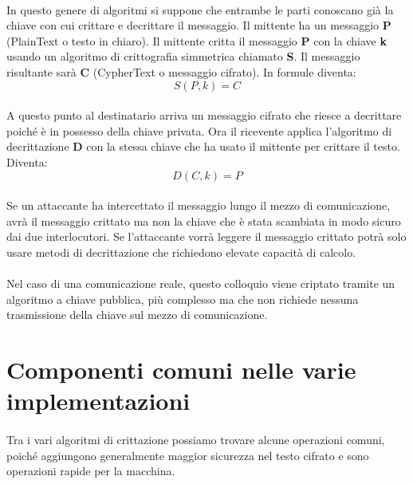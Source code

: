 \documentclass{article}
\begin{document}
		\paragraph{}
		In questo genere di algoritmi si suppone che entrambe le parti conoscano già la chiave con cui crittare e decrittare il messaggio. Il mittente ha un messaggio \textbf{P} (PlainText o testo in chiaro). Il mittente critta il messaggio \textbf{P} con la chiave \textbf{k} usando un algoritmo di crittografia simmetrica chiamato \textbf{S}. Il messaggio risultante sarà \textbf{C} (CypherText o messaggio cifrato). In formule diventa:
		\begin{equation*}
			S(P,k) = C
		\end{equation*}
		\paragraph{}
		A questo punto al destinatario arriva un messaggio cifrato che riesce a decrittare poiché è in possesso della chiave privata. Ora il ricevente applica l'algoritmo di decrittazione \textbf{D} con la stessa chiave che ha usato il mittente per crittare il testo. Diventa:
		\begin{equation*}
			D(C,k) = P
		\end{equation*}
		\paragraph{}
		Se un attaccante ha intercettato il messaggio lungo il mezzo di comunicazione, avrà il messaggio crittato ma non la chiave che è stata scambiata in modo sicuro dai due interlocutori. Se l'attaccante vorrà leggere il messaggio crittato potrà solo usare metodi di decrittazione che richiedono elevate capacità di calcolo.
		\paragraph{}
		Nel caso di una comunicazione reale, questo colloquio viene criptato tramite un algoritmo a chiave pubblica, più complesso ma che non richiede nessuna trasmissione della chiave sul mezzo di comunicazione.

	\section{Componenti comuni nelle varie implementazioni}

		\paragraph{}
		Tra i vari algoritmi di crittazione possiamo trovare alcune operazioni comuni, poiché aggiungono generalmente maggior sicurezza nel testo cifrato e sono operazioni rapide per la macchina.
\end{document}
